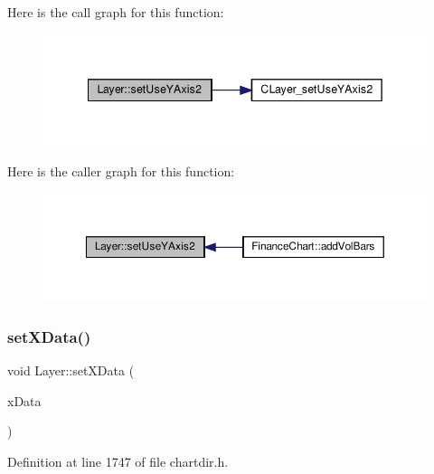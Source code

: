 Here is the call graph for this function\+:
\nopagebreak
\begin{figure}[H]
\begin{center}
\leavevmode
\includegraphics[width=342pt]{class_layer_ade6f7d6d3b8e9170301f87d5364480bc_cgraph}
\end{center}
\end{figure}
Here is the caller graph for this function\+:
\nopagebreak
\begin{figure}[H]
\begin{center}
\leavevmode
\includegraphics[width=350pt]{class_layer_ade6f7d6d3b8e9170301f87d5364480bc_icgraph}
\end{center}
\end{figure}
\mbox{\label{class_layer_a6cc7d6e69afe7e9a9c33052f01546f80}} 
\subsubsection{\texorpdfstring{set\+X\+Data()}{setXData()}\hspace{0.1cm}{\footnotesize\ttfamily [1/2]}}
{\footnotesize\ttfamily void Layer\+::set\+X\+Data (\begin{DoxyParamCaption}\item[{\hyperlink{class_double_array}{Double\+Array}}]{x\+Data }\end{DoxyParamCaption})\hspace{0.3cm}{\ttfamily [inline]}}



Definition at line 1747 of file chartdir.\+h.

